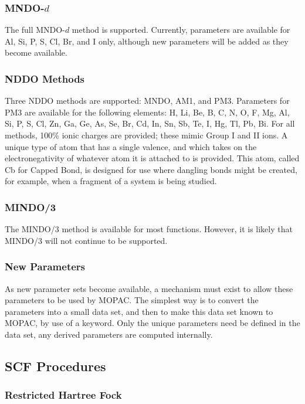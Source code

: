 \subsubsection*{MNDO-$d$}

The full MNDO-$d$ method is supported.  Currently, parameters are available for
Al, Si, P, S, Cl, Br, and I only, although new parameters will be added as they
become available.

\subsubsection*{NDDO Methods}

Three NDDO methods are supported: MNDO, AM1, and PM3.  Parameters for  PM3 are
available for the following elements: H, Li, Be, B, C, N, O, F,  Mg, Al,  Si,
P, S, Cl, Zn, Ga, Ge, As, Se, Br, Cd, In, Sn,  Sb, Te, I, Hg, Tl, Pb, Bi.  For
all  methods, 100\% ionic charges are provided; these mimic Group I and II
ions.  A  unique type of atom that has a single valence, and which takes on
the  electronegativity  of whatever atom it is attached to is provided.  This
atom, called Cb for Capped Bond, is designed for use where dangling bonds
might  be created, for example, when a fragment of a system is being studied.

\subsubsection*{MINDO/3}

The MINDO/3 method is available for most functions.  However, it is likely that
MINDO/3 will not continue to be supported.

\subsubsection*{New Parameters}

As new parameter sets become available, a mechanism must exist to allow these
parameters to be used by MOPAC.  The simplest way is to convert the
parameters into a small data set, and then to make this data set known to
MOPAC, by use of a keyword.  Only the unique parameters need be defined in
the data set, any derived parameters are computed internally.

\subsection{SCF Procedures}

\subsubsection*{Restricted Hartree Fock}

